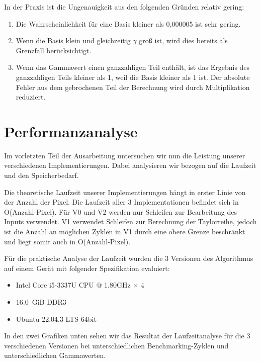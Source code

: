 \documentclass[course=erap]{aspdoc}
\begin{document}
\par
In der Praxis ist die Ungenauigkeit aus den folgenden Gründen relativ gering:
\begin{enumerate}
\item Die Wahrscheinlichkeit für eine Basis kleiner als 0,000005 ist sehr gering.
\item Wenn die Basis klein und gleichzeitig $\gamma$ groß ist, wird dies bereits als Grenzfall berücksichtigt.
\item Wenn das Gammawert einen ganzzahligen Teil enthält, ist das Ergebnis des ganzzahligen Teils kleiner als 1, weil die Basis kleiner als 1 ist. Der absolute Fehler aus dem gebrochenen Teil der Berechnung wird durch Multiplikation reduziert.
\end{enumerate}


\section{Performanzanalyse}
\par
Im vorletzten Teil der Ausarbeitung untersuchen wir nun die Leistung unserer verschiedenen Implementierungen. Dabei analysieren wir bezogen auf die Laufzeit und den Speicherbedarf.

\par
Die theoretische Laufzeit unserer Implementierungen hängt in erster Linie von der Anzahl der Pixel. Die Laufzeit aller 3 Implementationen befindet sich in O(Anzahl-Pixel). Für V0 und V2 werden nur Schleifen zur Bearbeitung des Inputs verwendet. V1 verwendet Schleifen zur Berechnung der Taylorreihe, jedoch ist die Anzahl an möglichen Zyklen in V1 durch eine obere Grenze beschränkt und liegt somit auch in O(Anzahl-Pixel).

\par
Für die praktische Analyse der Laufzeit wurden die 3 Versionen des Algorithmus auf einem Gerät mit folgender Spezifikation evaluiert:

\begin{itemize}
\item Intel Core i5-3337U CPU @ 1.80GHz × 4
\item 16.0 GiB DDR3
\item Ubuntu 22.04.3 LTS 64bit
\end{itemize}

\par
In den zwei Grafiken unten sehen wir das Resultat der Laufzeitanalyse für die 3 verschiedenen Versionen bei unterschiedlichen Benchmarking-Zyklen und unterschiedlichen Gammawerten.
\end{document}
